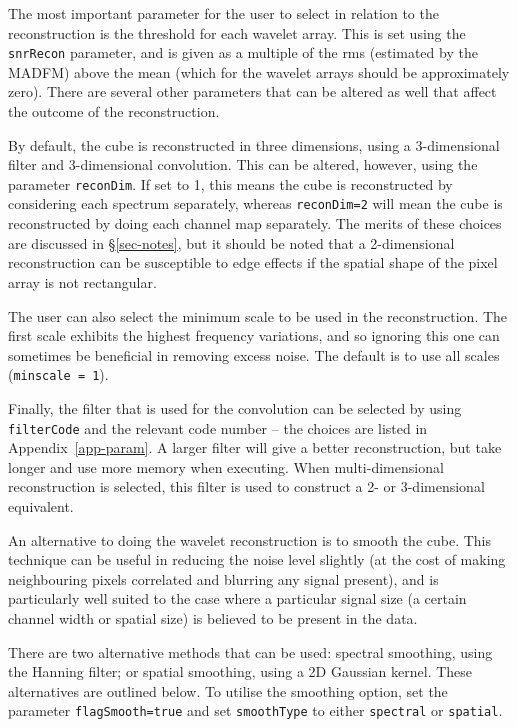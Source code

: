 
The most important parameter for the user to select in relation to the
reconstruction is the threshold for each wavelet array. This is set
using the \texttt{snrRecon} parameter, and is given as a multiple of
the rms (estimated by the MADFM) above the mean (which for the wavelet
arrays should be approximately zero). There are several other
parameters that can be altered as well that affect the outcome of the
reconstruction.

By default, the cube is reconstructed in three dimensions, using a
3-dimensional filter and 3-dimensional convolution. This can be
altered, however, using the parameter \texttt{reconDim}. If set to 1,
this means the cube is reconstructed by considering each spectrum
separately, whereas \texttt{reconDim=2} will mean the cube is
reconstructed by doing each channel map separately. The merits of
these choices are discussed in \S\ref{sec-notes}, but it should be
noted that a 2-dimensional reconstruction can be susceptible to edge
effects if the spatial shape of the pixel array is not rectangular.

The user can also select the minimum scale to be used in the
reconstruction. The first scale exhibits the highest frequency
variations, and so ignoring this one can sometimes be beneficial in
removing excess noise. The default is to use all scales
(\texttt{minscale = 1}).

Finally, the filter that is used for the convolution can be selected
by using \texttt{filterCode} and the relevant code number -- the
choices are listed in Appendix~\ref{app-param}. A larger filter will
give a better reconstruction, but take longer and use more memory when
executing. When multi-dimensional reconstruction is selected, this
filter is used to construct a 2- or 3-dimensional equivalent.

\label{sec-smoothing}

An alternative to doing the wavelet reconstruction is to smooth the
cube.  This technique can be useful in reducing the noise level
slightly (at the cost of making neighbouring pixels correlated and
blurring any signal present), and is particularly well suited to the
case where a particular signal size (\ie a certain channel width or
spatial size) is believed to be present in the data.

There are two alternative methods that can be used: spectral
smoothing, using the Hanning filter; or spatial smoothing, using a 2D
Gaussian kernel. These alternatives are outlined below. To utilise the
smoothing option, set the parameter \texttt{flagSmooth=true} and set
\texttt{smoothType} to either \texttt{spectral} or \texttt{spatial}.

